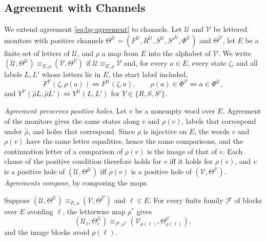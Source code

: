 \subsection{Agreement with Channels}\label{app:mo-agreement}

We extend agreement \cref{eq:bg-agreement} to channels. Let $\mathcal U$ and
$\mathcal V$ be lettered monitors with positive channels
$\Theta^{\mathcal U}=(F^{\mathcal U},R^{\mathcal U},S^{\mathcal U},
S'^{\mathcal U},\Phi^{\mathcal U})$ and $\Theta^{\mathcal V}$, let $E$ be a finite
set of letters of $\mathcal U$, and $\rho$ a map from $E$ into the alphabet of
$\mathcal V$. We write
$(\mathcal U,\Theta^{\mathcal U})\equiv_{E,\rho}(\mathcal V,\Theta^{\mathcal V})$
if $\mathcal U\equiv_{E,\rho}\mathcal V$ and, for every $a\in E$, every state
$\zeta$, and all labels $L,L'$ whose letters lie in $E$, the start label
included,
\[
 F^{\mathcal V}(\zeta,\rho(a))\iff F^{\mathcal U}(\zeta,a),\qquad
 \rho(a)\in\Phi^{\mathcal V}\iff a\in\Phi^{\mathcal U},
\]
and $Y^{\mathcal V}(\widehat\rho L,\widehat\rho L')\iff Y^{\mathcal U}(L,L')$ for
$Y\in\{R,S,S'\}$.

\emph{Agreement preserves positive holes.} Let $v$ be a nonempty word over $E$.
Agreement of the monitors gives the same states along $v$ and $\rho(v)$, labels
that correspond under $\widehat\rho$, and holes that correspond. Since $\rho$ is
injective on $E$, the words $v$ and $\rho(v)$ have the same letter equalities,
hence the same comparisons, and the continuation letter of a comparison of
$\rho(v)$ is the image of that of $v$. Each clause of the positive condition
therefore holds for $v$ iff it holds for $\rho(v)$, and $v$ is a positive hole
of $(\mathcal U,\Theta^{\mathcal U})$ iff $\rho(v)$ is a positive hole of
$(\mathcal V,\Theta^{\mathcal V})$. \emph{Agreements compose}, by composing the
maps.

\begin{lemma}\label{lem:mo-agreement}
Suppose $(\mathcal U,\Theta^{\mathcal U})\equiv_{E,\rho}(\mathcal
V,\Theta^{\mathcal V})$ and $\ell\in E$. For every finite family $\mathcal F$ of
blocks over $E$ avoiding $\ell$, the letterwise map $\rho^*$ gives
\[
 (\mathcal U_\ell,\Theta^{\mathcal U}_\ell)\equiv_{\mathcal F,\rho^*}
 (\mathcal V_{\rho(\ell)},\Theta^{\mathcal V}_{\rho(\ell)}),
\]
and the image blocks avoid $\rho(\ell)$.
\end{lemma}

